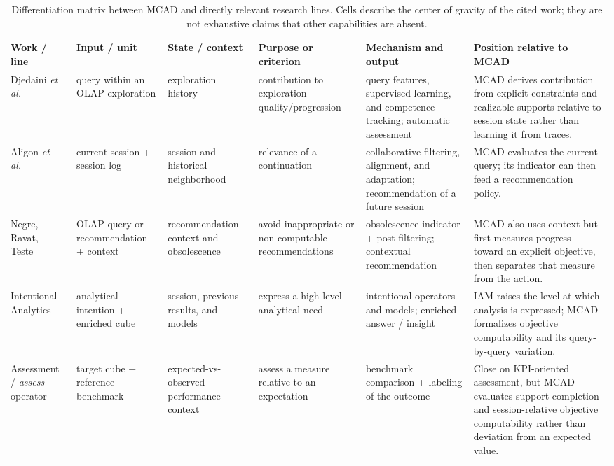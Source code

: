 \begin{table}[!t]
\centering
\caption{Differentiation matrix between MCAD and directly relevant research lines. Cells describe the center of gravity of the cited work; they are not exhaustive claims that other capabilities are absent.}
\label{tab:comparative-approaches}
\scriptsize
\setlength{\tabcolsep}{2.0pt}
\renewcommand{\arraystretch}{1.08}
\begin{tabularx}{\textwidth}{@{}p{2.05cm}p{2.15cm}p{2.05cm}p{2.25cm}p{3.45cm}X@{}}
\toprule
Work / line & Input / unit & State / context & Purpose or criterion & Mechanism and output & Position relative to MCAD \\
\midrule
Djedaini \emph{et al.}~\cite{DjedainiEtAl2019} & query within an OLAP exploration & exploration history & contribution to exploration quality/progression & query features, supervised learning, and competence tracking; automatic assessment & MCAD derives contribution from explicit constraints and realizable supports relative to session state rather than learning it from traces. \\
Aligon \emph{et al.}~\cite{AligonDSS2015} & current session + session log & session and historical neighborhood & relevance of a continuation & collaborative filtering, alignment, and adaptation; recommendation of a future session & MCAD evaluates the current query; its indicator can then feed a recommendation policy. \\
Negre, Ravat, Teste~\cite{NegreRavatTeste2018} & OLAP query or recommendation + context & recommendation context and obsolescence & avoid inappropriate or non-computable recommendations & obsolescence indicator + post-filtering; contextual recommendation & MCAD also uses context but first measures progress toward an explicit objective, then separates that measure from the action. \\
Intentional Analytics~\cite{VassiliadisMarcelRizzi2019,FranciaPredict2026} & analytical intention + enriched cube & session, previous results, and models & express a high-level analytical need & intentional operators and models; enriched answer / insight & IAM raises the level at which analysis is expressed; MCAD formalizes objective computability and its query-by-query variation. \\
Assessment / \emph{assess} operator~\cite{FranciaAssess2021} & target cube + reference benchmark & expected-vs-observed performance context & assess a measure relative to an expectation & benchmark comparison + labeling of the outcome & Close on KPI-oriented assessment, but MCAD evaluates support completion and session-relative objective computability rather than deviation from an expected value. \\

\end{tabularx}
\end{table}
